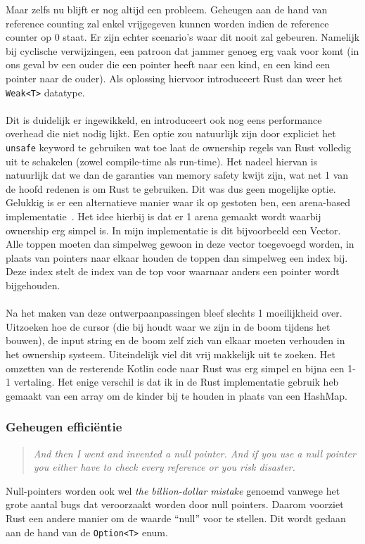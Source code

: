 Maar zelfs nu blijft er nog altijd een probleem.
Geheugen aan de hand van reference counting zal enkel vrijgegeven kunnen worden indien de reference counter op 0 staat.
Er zijn echter scenario's waar dit nooit zal gebeuren.
Namelijk bij cyclische verwijzingen, een patroon dat jammer genoeg erg vaak voor komt (in ons geval bv een ouder die een pointer heeft naar een kind, en een kind een pointer naar de ouder).
Als oplossing hiervoor introduceert Rust dan weer het \texttt{Weak<T>} datatype.
\\ \\
Dit is duidelijk er ingewikkeld, en introduceert ook nog eens performance overhead die niet nodig lijkt.
Een optie zou natuurlijk zijn door expliciet het \texttt{unsafe} keyword te gebruiken wat toe laat de ownership regels van Rust volledig uit te schakelen (zowel compile-time als run-time).
Het nadeel hiervan is natuurlijk dat we dan de garanties van memory safety kwijt zijn, wat net 1 van de hoofd redenen is om Rust te gebruiken.
Dit was dus geen mogelijke optie.
Gelukkig is er een alternatieve manier waar ik op gestoten ben, een arena-based implementatie~\cite{rust_arena_trees}.
Het idee hierbij is dat er 1 arena gemaakt wordt waarbij ownership erg simpel is.
In mijn implementatie is dit bijvoorbeeld een Vector.
Alle toppen moeten dan simpelweg gewoon in deze vector toegevoegd worden, in plaats van pointers naar elkaar houden de toppen dan simpelweg een index bij.
Deze index stelt de index van de top voor waarnaar anders een pointer wordt bijgehouden.
\\ \\
Na het maken van deze ontwerpaanpassingen bleef slechts 1 moeilijkheid over.
Uitzoeken hoe de cursor (die bij houdt waar we zijn in de boom tijdens het bouwen), de input string en de boom zelf zich van elkaar moeten verhouden in het ownership systeem.
Uiteindelijk viel dit vrij makkelijk uit te zoeken.
Het omzetten van de resterende Kotlin code naar Rust was erg simpel en bijna een 1-1 vertaling.
Het enige verschil is dat ik in de Rust implementatie gebruik heb gemaakt van een array om de kinder bij te houden in plaats van een HashMap.

\subsubsection{Geheugen efficiëntie}
\begin{quote}
    \textit{And then I went and invented a null pointer.
    And if you use a null pointer you either have to check every reference or you risk disaster. \cite{null_mistake}}
\end{quote}
Null-pointers worden ook wel \textit{the billion-dollar mistake} genoemd vanwege het grote aantal bugs dat veroorzaakt worden door null pointers.
Daarom voorziet Rust een andere manier om de waarde ``null'' voor te stellen.
Dit wordt gedaan aan de hand van de \texttt{Option<T>} enum.

